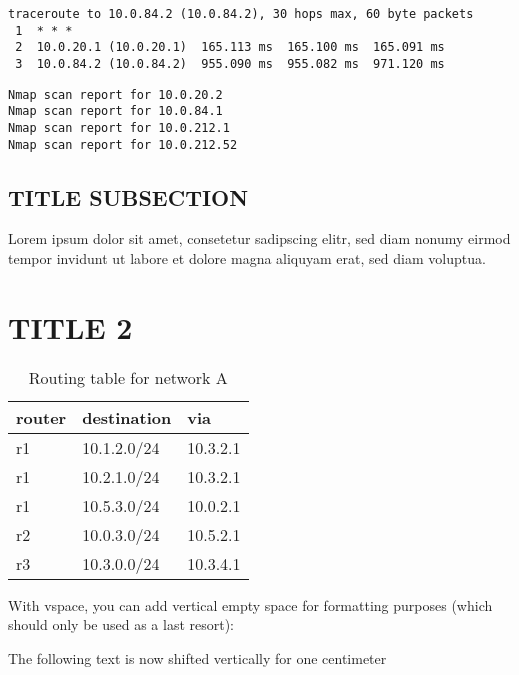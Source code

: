 \documentclass[parskip=full]{scrartcl}
\begin{document}
\begin{verbatim}
traceroute to 10.0.84.2 (10.0.84.2), 30 hops max, 60 byte packets
 1  * * *
 2  10.0.20.1 (10.0.20.1)  165.113 ms  165.100 ms  165.091 ms
 3  10.0.84.2 (10.0.84.2)  955.090 ms  955.082 ms  971.120 ms
\end{verbatim}

\begin{verbatim}
Nmap scan report for 10.0.20.2
Nmap scan report for 10.0.84.1
Nmap scan report for 10.0.212.1
Nmap scan report for 10.0.212.52
\end{verbatim}



\subsection{TITLE SUBSECTION}
Lorem ipsum dolor sit amet, consetetur sadipscing elitr, sed diam nonumy eirmod tempor invidunt ut labore et dolore magna aliquyam erat, sed diam voluptua.

\section{TITLE 2}
\begin{table}[hb]
    \centering
    \caption{Routing table for network A}
    \label{tab:routing}
    \begin{tabular}{lll}
        \toprule
        \textbf{router} & \textbf{destination} & \textbf{via}  \\ \midrule
        r1 & 10.1.2.0/24 & 10.3.2.1 \\
        r1 & 10.2.1.0/24 & 10.3.2.1 \\
        r1 & 10.5.3.0/24 & 10.0.2.1 \\
        \midrule
        r2 & 10.0.3.0/24 & 10.5.2.1 \\
        \midrule
        r3 & 10.3.0.0/24 & 10.3.4.1 \\
        \bottomrule
    \end{tabular}
\end{table}
With vspace, you can add vertical empty space for formatting purposes (which should only be used as a last resort):
\vspace*{1cm}

The following text is now shifted vertically for one centimeter
\end{document}
